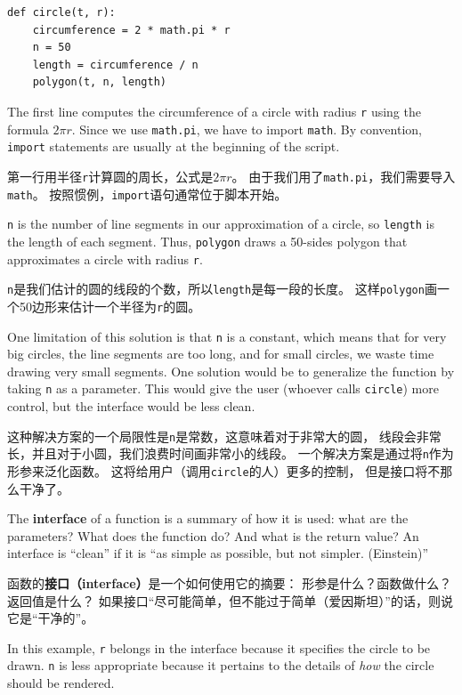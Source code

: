 \documentclass[10pt]{book}
\begin{document}
\begin{CJK}{UTF8}{gbsn}
\begin{verbatim}
def circle(t, r):
    circumference = 2 * math.pi * r
    n = 50
    length = circumference / n
    polygon(t, n, length)
\end{verbatim}
%
The first line computes the circumference of a circle with radius
{\tt r} using the formula $2 \pi r$.  Since we use {\tt math.pi}, we
have to import {\tt math}.  By convention, {\tt import} statements
are usually at the beginning of the script.

第一行用半径{\tt r}计算圆的周长，公式是$2 \pi r$。
由于我们用了{\tt math.pi}，我们需要导入{\tt math}。
按照惯例，{\tt import}语句通常位于脚本开始。

{\tt n} is the number of line segments in our approximation of a circle,
so {\tt length} is the length of each segment.  Thus, {\tt polygon}
draws a 50-sides polygon that approximates a circle with radius {\tt r}.

{\tt n}是我们估计的圆的线段的个数，所以{\tt length}是每一段的长度。
这样{\tt polygon}画一个50边形来估计一个半径为{\tt r}的圆。

One limitation of this solution is that {\tt n} is a constant, which
means that for very big circles, the line segments are too long, and
for small circles, we waste time drawing very small segments.  One
solution would be to generalize the function by taking {\tt n} as
a parameter.  This would give the user (whoever calls {\tt circle})
more control, but the interface would be less clean.

这种解决方案的一个局限性是{\tt n}是常数，这意味着对于非常大的圆，
线段会非常长，并且对于小圆，我们浪费时间画非常小的线段。
一个解决方案是通过将{\tt n}作为形参来泛化函数。
这将给用户（调用{\tt circle}的人）更多的控制，
但是接口将不那么干净了。

The {\bf interface} of a function is a summary of how it is used: what
are the parameters?  What does the function do?  And what is the return
value?  An interface is ``clean'' if it is ``as simple as
possible, but not simpler. (Einstein)''

函数的{\bf 接口（interface）}是一个如何使用它的摘要：
形参是什么？函数做什么？返回值是什么？
如果接口``尽可能简单，但不能过于简单（爱因斯坦）''的话，则说它是``干净的''。

In this example, {\tt r} belongs in the interface because it
specifies the circle to be drawn.  {\tt n} is less appropriate
because it pertains to the details of {\em how} the circle should
be rendered.


\end{CJK}
\end{document}

